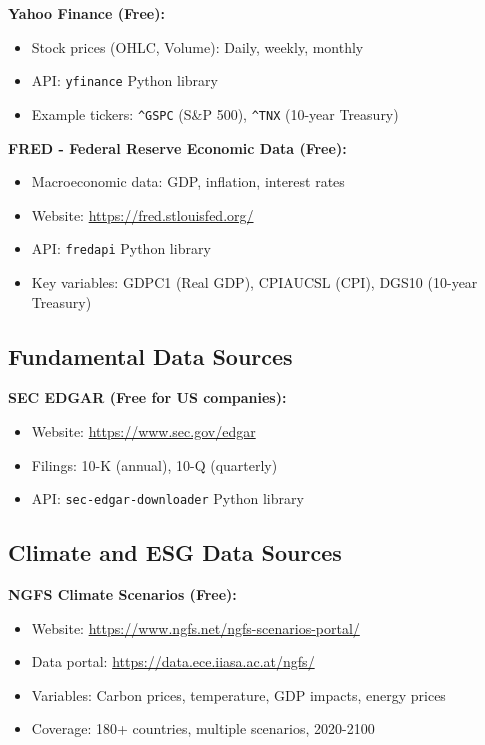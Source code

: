 \documentclass[11pt,a4paper]{article}
\begin{document}
\textbf{Yahoo Finance (Free):}
\begin{itemize}
    \item Stock prices (OHLC, Volume): Daily, weekly, monthly
    \item API: \texttt{yfinance} Python library
    \item Example tickers: \texttt{\^{}GSPC} (S\&P 500), \texttt{\^{}TNX} (10-year Treasury)
\end{itemize}

\textbf{FRED - Federal Reserve Economic Data (Free):}
\begin{itemize}
    \item Macroeconomic data: GDP, inflation, interest rates
    \item Website: \url{https://fred.stlouisfed.org/}
    \item API: \texttt{fredapi} Python library
    \item Key variables: GDPC1 (Real GDP), CPIAUCSL (CPI), DGS10 (10-year Treasury)
\end{itemize}

\subsection{Fundamental Data Sources}

\textbf{SEC EDGAR (Free for US companies):}
\begin{itemize}
    \item Website: \url{https://www.sec.gov/edgar}
    \item Filings: 10-K (annual), 10-Q (quarterly)
    \item API: \texttt{sec-edgar-downloader} Python library
\end{itemize}

\subsection{Climate and ESG Data Sources}

\textbf{NGFS Climate Scenarios (Free):}
\begin{itemize}
    \item Website: \url{https://www.ngfs.net/ngfs-scenarios-portal/}
    \item Data portal: \url{https://data.ece.iiasa.ac.at/ngfs/}
    \item Variables: Carbon prices, temperature, GDP impacts, energy prices
    \item Coverage: 180+ countries, multiple scenarios, 2020-2100
\end{itemize}
\end{document}
